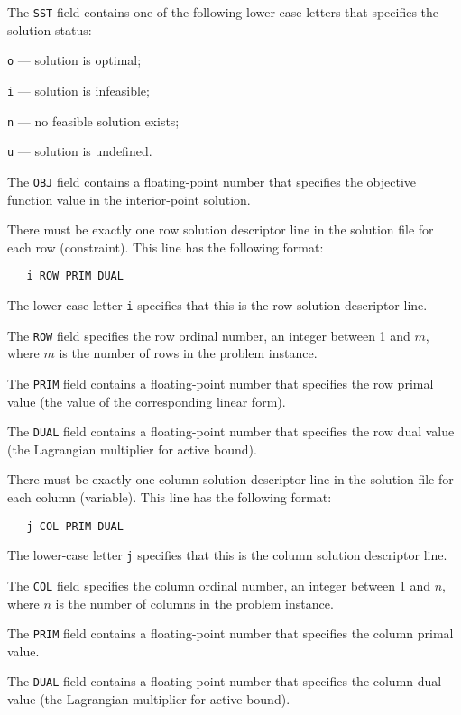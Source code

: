 The \verb|SST| field contains one of the following lower-case letters
that specifies the solution status:

\verb|o| --- solution is optimal;

\verb|i| --- solution is infeasible;

\verb|n| --- no feasible solution exists;

\verb|u| --- solution is undefined.

The \verb|OBJ| field contains a floating-point number that specifies
the objective function value in the interior-point solution.

 There must be exactly one row solution
descriptor line in the solution file for each row (constraint). This
line has the following format:

\begin{verbatim}
   i ROW PRIM DUAL
\end{verbatim}

The lower-case letter \verb|i| specifies that this is the row solution
descriptor line.


The \verb|ROW| field specifies the row ordinal number, an integer
between 1 and $m$, where $m$ is the number of rows in the problem
instance.

The \verb|PRIM| field contains a floating-point number that specifies
the row primal value (the value of the corresponding linear form).

The \verb|DUAL| field contains a floating-point number that specifies
the row dual value (the Lagrangian multiplier for active bound).

 There must be exactly one column
solution descriptor line in the solution file for each column
(variable). This line has the following format:

\begin{verbatim}
   j COL PRIM DUAL
\end{verbatim}

The lower-case letter \verb|j| specifies that this is the column
solution descriptor line.

The \verb|COL| field specifies the column ordinal number, an integer
between 1 and $n$, where $n$ is the number of columns in the problem
instance.

The \verb|PRIM| field contains a floating-point number that specifies
the column primal value.

The \verb|DUAL| field contains a floating-point number that specifies
the column dual value (the Lagrangian multiplier for active bound).

